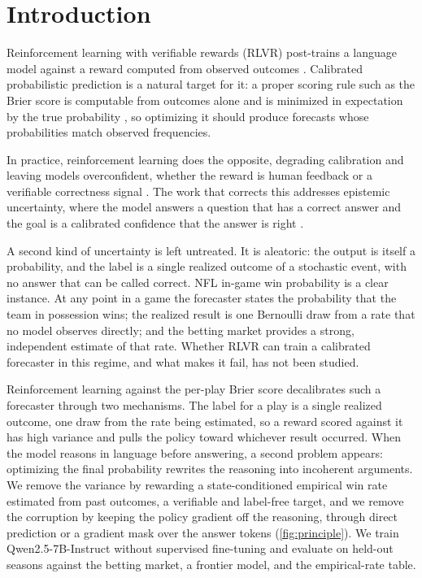 \section{Introduction}
\label{sec:intro}



Reinforcement learning with verifiable rewards (RLVR) post-trains a language model against a reward
computed from observed outcomes \citep{grpo, deepseek_r1}. Calibrated probabilistic prediction is a
natural target for it: a proper scoring rule such as the Brier score is computable from outcomes alone
and is minimized in expectation by the true probability \citep{brier1950, gneiting2007}, so optimizing
it should produce forecasts whose probabilities match observed frequencies.

In practice, reinforcement learning does the opposite, degrading calibration and leaving models
overconfident, whether the reward is human feedback \citep{leng2024} or a verifiable correctness signal
\citep{dcpo, uncalibrated_reasoning}. The work that corrects this addresses epistemic uncertainty, where
the model answers a question that has a correct answer and the goal is a calibrated confidence that the
answer is right \citep{rlcr, dcpo}.

A second kind of uncertainty is left untreated. It is aleatoric: the output is itself a probability, and
the label is a single realized outcome of a stochastic event, with no answer that can be called correct.
NFL in-game win probability is a clear instance. At any point in a game the forecaster states the
probability that the team in possession wins; the realized result is one Bernoulli draw from a rate that
no model observes directly; and the betting market provides a strong, independent estimate of that rate.
Whether RLVR can train a calibrated forecaster in this regime, and what makes it fail, has not been
studied.

Reinforcement learning against the per-play Brier score decalibrates such a forecaster through two
mechanisms. The label for a play is a single realized outcome, one draw from the rate being estimated,
so a reward scored against it has high variance and pulls the policy toward whichever result occurred.
When the model reasons in language before answering, a second problem appears: optimizing the final
probability rewrites the reasoning into incoherent arguments. We remove the variance by rewarding a
state-conditioned empirical win rate estimated from past outcomes, a verifiable and label-free target,
and we remove the corruption by keeping the policy gradient off the reasoning, through direct prediction
or a gradient mask over the answer tokens (\cref{fig:principle}). We train Qwen2.5-7B-Instruct without supervised fine-tuning
and evaluate on held-out seasons against the betting market, a frontier model, and the empirical-rate
table.

